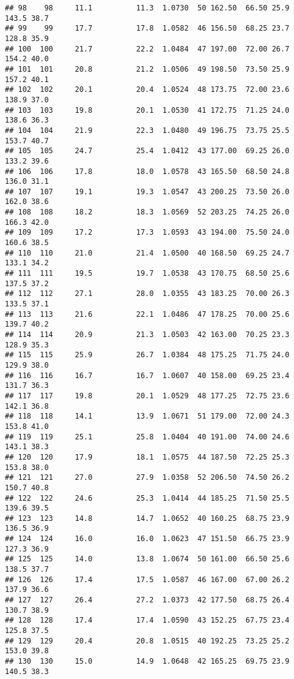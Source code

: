 \documentclass[
]{book}
\theoremstyle{definition}
\theoremstyle{definition}
\theoremstyle{definition}
\theoremstyle{definition}
\theoremstyle{remark}
\begin{document}
\begin{verbatim}
## 98    98     11.1          11.3  1.0730  50 162.50  66.50 25.9    143.5 38.7
## 99    99     17.7          17.8  1.0582  46 156.50  68.25 23.7    128.8 35.9
## 100  100     21.7          22.2  1.0484  47 197.00  72.00 26.7    154.2 40.0
## 101  101     20.8          21.2  1.0506  49 198.50  73.50 25.9    157.2 40.1
## 102  102     20.1          20.4  1.0524  48 173.75  72.00 23.6    138.9 37.0
## 103  103     19.8          20.1  1.0530  41 172.75  71.25 24.0    138.6 36.3
## 104  104     21.9          22.3  1.0480  49 196.75  73.75 25.5    153.7 40.7
## 105  105     24.7          25.4  1.0412  43 177.00  69.25 26.0    133.2 39.6
## 106  106     17.8          18.0  1.0578  43 165.50  68.50 24.8    136.0 31.1
## 107  107     19.1          19.3  1.0547  43 200.25  73.50 26.0    162.0 38.6
## 108  108     18.2          18.3  1.0569  52 203.25  74.25 26.0    166.3 42.0
## 109  109     17.2          17.3  1.0593  43 194.00  75.50 24.0    160.6 38.5
## 110  110     21.0          21.4  1.0500  40 168.50  69.25 24.7    133.1 34.2
## 111  111     19.5          19.7  1.0538  43 170.75  68.50 25.6    137.5 37.2
## 112  112     27.1          28.0  1.0355  43 183.25  70.00 26.3    133.5 37.1
## 113  113     21.6          22.1  1.0486  47 178.25  70.00 25.6    139.7 40.2
## 114  114     20.9          21.3  1.0503  42 163.00  70.25 23.3    128.9 35.3
## 115  115     25.9          26.7  1.0384  48 175.25  71.75 24.0    129.9 38.0
## 116  116     16.7          16.7  1.0607  40 158.00  69.25 23.4    131.7 36.3
## 117  117     19.8          20.1  1.0529  48 177.25  72.75 23.6    142.1 36.8
## 118  118     14.1          13.9  1.0671  51 179.00  72.00 24.3    153.8 41.0
## 119  119     25.1          25.8  1.0404  40 191.00  74.00 24.6    143.1 38.3
## 120  120     17.9          18.1  1.0575  44 187.50  72.25 25.3    153.8 38.0
## 121  121     27.0          27.9  1.0358  52 206.50  74.50 26.2    150.7 40.8
## 122  122     24.6          25.3  1.0414  44 185.25  71.50 25.5    139.6 39.5
## 123  123     14.8          14.7  1.0652  40 160.25  68.75 23.9    136.5 36.9
## 124  124     16.0          16.0  1.0623  47 151.50  66.75 23.9    127.3 36.9
## 125  125     14.0          13.8  1.0674  50 161.00  66.50 25.6    138.5 37.7
## 126  126     17.4          17.5  1.0587  46 167.00  67.00 26.2    137.9 36.6
## 127  127     26.4          27.2  1.0373  42 177.50  68.75 26.4    130.7 38.9
## 128  128     17.4          17.4  1.0590  43 152.25  67.75 23.4    125.8 37.5
## 129  129     20.4          20.8  1.0515  40 192.25  73.25 25.2    153.0 39.8
## 130  130     15.0          14.9  1.0648  42 165.25  69.75 23.9    140.5 38.3

\end{verbatim}
\end{document}
